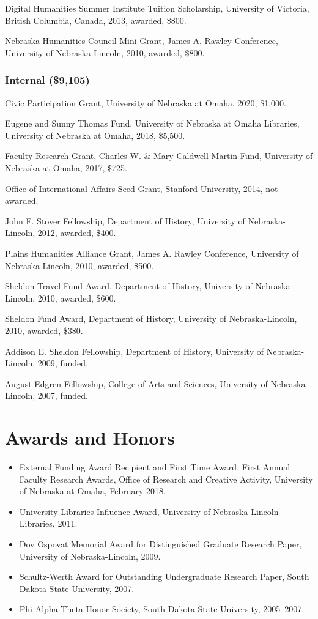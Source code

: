 Digital Humanities Summer Institute Tuition Scholarship, University of
Victoria, British Columbia, Canada, 2013, awarded, \$800.

Nebraska Humanities Council Mini Grant, James A. Rawley Conference,
University of Nebraska-Lincoln, 2010, awarded, \$800.

\subsubsection{Internal (\$9,105)}\label{internal-9105}

Civic Participation Grant, University of Nebraska at Omaha, 2020,
\$1,000.

Eugene and Sunny Thomas Fund, University of Nebraska at Omaha Libraries,
University of Nebraska at Omaha, 2018, \$5,500.

Faculty Research Grant, Charles W. \& Mary Caldwell Martin Fund,
University of Nebraska at Omaha, 2017, \$725.

Office of International Affairs Seed Grant, Stanford University, 2014,
not awarded.

John F. Stover Fellowship, Department of History, University of
Nebraska-Lincoln, 2012, awarded, \$400.

Plains Humanities Alliance Grant, James A. Rawley Conference, University
of Nebraska-Lincoln, 2010, awarded, \$500.

Sheldon Travel Fund Award, Department of History, University of
Nebraska-Lincoln, 2010, awarded, \$600.

Sheldon Fund Award, Department of History, University of
Nebraska-Lincoln, 2010, awarded, \$380.

Addison E. Sheldon Fellowship, Department of History, University of
Nebraska-Lincoln, 2009, funded.

August Edgren Fellowship, College of Arts and Sciences, University of
Nebraska-Lincoln, 2007, funded.

\section{Awards and Honors}\label{awards-and-honors}

\begin{itemize}
\tightlist
\item
  External Funding Award Recipient and First Time Award, First Annual
  Faculty Research Awards, Office of Research and Creative Activity,
  University of Nebraska at Omaha, February 2018.
\item
  University Libraries Influence Award, University of Nebraska-Lincoln
  Libraries, 2011.
\item
  Dov Ospovat Memorial Award for Distinguished Graduate Research Paper,
  University of Nebraska-Lincoln, 2009.
\item
  Schultz-Werth Award for Outstanding Undergraduate Research Paper,
  South Dakota State University, 2007.
\item
  Phi Alpha Theta Honor Society, South Dakota State University,
  2005--2007.
\end{itemize}

